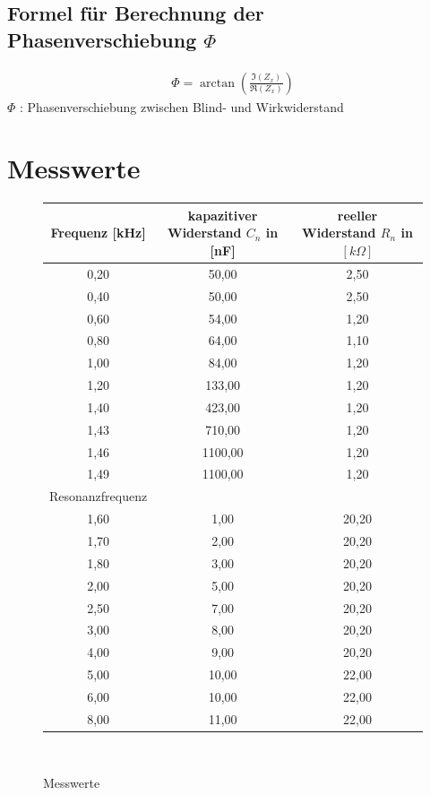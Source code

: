 \documentclass[fontsize=12pt]{scrartcl}
\begin{document}
\subsection{Formel für Berechnung der Phasenverschiebung $\Phi$}
\begin{align}
\Phi = \arctan\left(\frac{\Im(Z_{x})}{\Re(Z_{x})}\right)
\end{align}
\noindent
$\Phi$ : 	Phasenverschiebung zwischen Blind- und Wirkwiderstand 

\newpage

\section{ Messwerte}
\begin{figure}[h]
\centering
\caption{Messwerte}
\begin{tabular}{|c|c|c|} \hline
Frequenz [kHz]	&kapazitiver Widerstand $C_n$ in [nF]&reeller Widerstand $R_n$ in $[k\Omega]$ \\ \hline	
0,20	&50,00	&2,50 \\ \hline
0,40	&50,00	&2,50 \\ \hline
0,60	&54,00	&1,20 \\ \hline
0,80	&64,00	&1,10 \\ \hline
1,00	&84,00	&1,20 \\ \hline
1,20	&133,00	&1,20 \\ \hline
1,40	&423,00	&1,20 \\ \hline
1,43	&710,00	&1,20 \\ \hline
1,46	&1100,00	&1,20 \\ \hline
1,49	&1100,00	&1,20 \\ \hline		
\multicolumn{1}{c}{Resonanzfrequenz} \\ \hline
1,60	&1,00	&20,20 \\ \hline
1,70	&2,00	&20,20 \\ \hline
1,80	&3,00	&20,20 \\ \hline
2,00	&5,00	&20,20 \\ \hline
2,50	&7,00	&20,20 \\ \hline
3,00	&8,00	&20,20 \\ \hline
4,00	&9,00	&20,20 \\ \hline
5,00	&10,00	&22,00 \\ \hline
6,00	&10,00	&22,00 \\ \hline
8,00	&11,00	&22,00  \\ \hline
\end{tabular} \\
\end{figure}
\newpage
\end{document}
